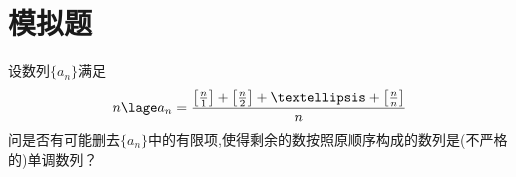 \documentclass[]{article}
\title{}
\author{}
\date{}
\begin{document}
\maketitle
\section{模拟题}{
设数列$\{ a_n \}$满足
\begin{equation}n\nonumber \lage
    a_n=\frac{\left [ \frac{n}{1}\right]+\left [ \frac{n}{2}\right]+…+\left [ \frac{n}{n}\right]}{n}
\end{equation}
问是否有可能删去$\{ a_n \}$中的有限项,使得剩余的数按照原顺序构成的数列是(不严格的)单调数列？
}
\end{document}
